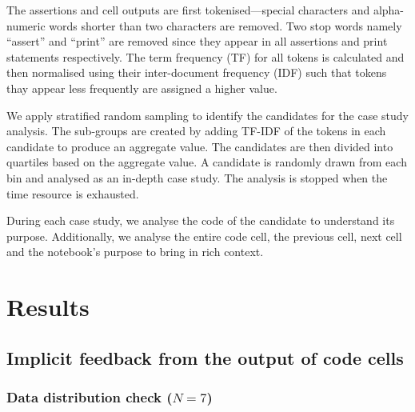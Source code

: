 
The assertions and cell outputs are first tokenised---special characters and alpha-numeric words shorter than two characters are removed. Two stop words namely ``assert'' and ``print'' are removed since they appear in all assertions and print statements respectively. The term frequency (TF) for all tokens is calculated and then normalised using their inter-document frequency (IDF) such that tokens thay appear less frequently are assigned a higher value.

We apply stratified random sampling to identify the candidates for the case study analysis. The sub-groups are created by adding TF-IDF of the tokens in each candidate to produce an aggregate value. The candidates are then divided into quartiles based on the aggregate value. A candidate is randomly drawn from each bin and analysed as an in-depth case study. The analysis is stopped when the time resource is exhausted.

During each case study, we analyse the code of the candidate to understand its purpose. Additionally, we analyse the entire code cell, the previous cell, next cell and the notebook's purpose to bring in rich context.

\section{Results}


\subsection{Implicit feedback from the output of code cells}

\subsubsection{Data distribution check ($N = 7$)}



